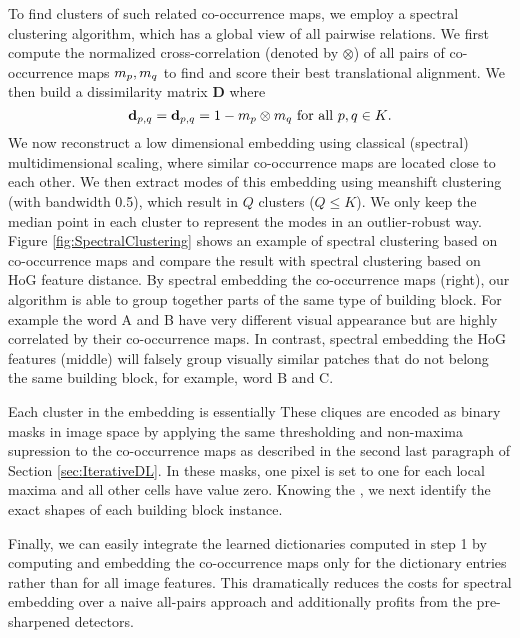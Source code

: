 \documentclass{acmtog}
\begin{document}
To find clusters of such related co-occurrence maps, we employ a spectral clustering algorithm, which has a global view of all pairwise relations. We first compute the normalized cross-correlation (denoted by $\otimes$) of all pairs of co-occurrence maps $m_{p},m_{q}$ to find and score their best translational alignment. We then build a dissimilarity matrix $\textbf{D}$ where
%
\begin{equation}
\textbf{d}_{p, q} = \textbf{d}_{p, q} = 1 - m_{p} \otimes m_{q} \text{ for all } p,q \in K\text{.}
\label{eq:distanceMatrix}
\end{equation}
%
We now reconstruct a low dimensional embedding using classical (spectral) multidimensional scaling, where similar co-occurrence maps are located close to each other. We then extract modes of this embedding using meanshift clustering (with bandwidth 0.5), which result in $Q$ clusters ($Q \leq K$). We only keep the median point in each cluster to represent the modes in an outlier-robust way. Figure \ref{fig:SpectralClustering} shows an example of spectral clustering based on co-occurrence maps and compare the result with spectral clustering based on HoG feature distance. By spectral embedding the co-occurrence maps (right), our algorithm is able to group together parts of the same type of building block. For example the word A and B have very different visual appearance but are highly correlated by their co-occurrence maps. In contrast, spectral embedding the HoG features (middle) will falsely group visually similar patches that do not belong the same building block, for example, word B and C.

Each cluster in the embedding is essentially  These cliques are encoded as binary masks in image space by applying the same thresholding and non-maxima supression to the  co-occurrence maps as described in the second last paragraph of Section \ref{sec:IterativeDL}. In these masks, one pixel is set to one for each local maxima and all other cells have value zero. Knowing the , we next identify the exact shapes of each building block instance.  

Finally, we can easily integrate the learned dictionaries computed in step 1 by computing and embedding the co-occurrence maps only for the dictionary entries rather than for all image features. This dramatically reduces the costs for spectral embedding over a naive all-pairs approach and additionally profits from the pre-sharpened detectors.
\end{document}

